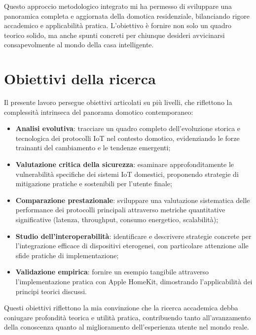 Questo approccio metodologico integrato mi ha permesso di sviluppare una panoramica completa e aggiornata della domotica residenziale, bilanciando rigore accademico e applicabilità pratica. L'obiettivo è fornire non solo un quadro teorico solido, ma anche spunti concreti per chiunque desideri avvicinarsi consapevolmente al mondo della casa intelligente.

\section{Obiettivi della ricerca}
Il presente lavoro persegue obiettivi articolati su più livelli, che riflettono la complessità intrinseca del panorama domotico contemporaneo:

\begin{itemize}
\item \textbf{Analisi evolutiva}: tracciare un quadro completo dell'evoluzione storica e tecnologica dei protocolli IoT nel contesto domotico, evidenziando le forze trainanti del cambiamento e le tendenze emergenti;
\item \textbf{Valutazione critica della sicurezza}: esaminare approfonditamente le vulnerabilità specifiche dei sistemi IoT domestici, proponendo strategie di mitigazione pratiche e sostenibili per l'utente finale;
\item \textbf{Comparazione prestazionale}: sviluppare una valutazione sistematica delle performance dei protocolli principali attraverso metriche quantitative significative (latenza, throughput, consumo energetico, scalabilità);
\item \textbf{Studio dell'interoperabilità}: identificare e descrivere strategie concrete per l'integrazione efficace di dispositivi eterogenei, con particolare attenzione alle sfide pratiche di implementazione;
\item \textbf{Validazione empirica}: fornire un esempio tangibile attraverso l'implementazione pratica con Apple HomeKit, dimostrando l'applicabilità dei principi teorici discussi.
\end{itemize}

Questi obiettivi riflettono la mia convinzione che la ricerca accademica debba coniugare profondità teorica e utilità pratica, contribuendo tanto all'avanzamento della conoscenza quanto al miglioramento dell'esperienza utente nel mondo reale.